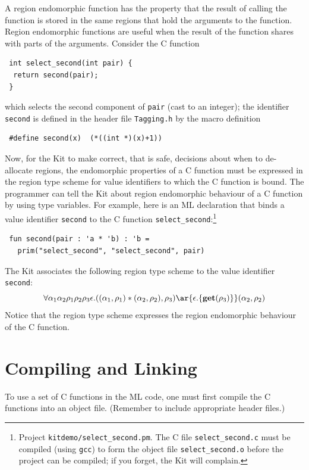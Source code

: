 \documentclass[12pt]{book}
\begin{document}
A region endomorphic function has the property that the result of
calling the function is stored in the same regions that hold the
arguments to the function. Region endomorphic functions are useful
when the result of the function shares with parts of the arguments.
Consider the C function
\begin{verbatim}
 int select_second(int pair) {
  return second(pair);
 }
\end{verbatim}
which selects the second component of {\tt pair} (cast to an
integer); the identifier {\tt second} is defined in the header
file {\tt Tagging.h} by the macro definition
\begin{verbatim}
 #define second(x)  (*((int *)(x)+1))
\end{verbatim}

Now, for the Kit to make correct, that is safe, decisions about when
to de-allocate regions, the endomorphic properties of a C function
must be expressed in the region type scheme for value identifiers
to which the C function is bound. The programmer can tell the Kit
about region endomorphic behaviour of a C function by using type
variables.  For example, here is an ML declaration that binds a value
identifier {\tt second} to the C function
\verb|select_second|:\footnote{Project {\tt kitdemo/select\_second.pm}. The C
  file {\tt select\_second.c} must be compiled (using {\tt gcc}) to
  form the object file {\tt select\_second.o} before the project can
  be compiled; if you forget, the Kit will complain.}
\begin{verbatim}
 fun second(pair : 'a * 'b) : 'b =
   prim("select_second", "select_second", pair)
\end{verbatim}
The Kit associates the following region type scheme to the value
identifier {\tt second}:
$$\forall \alpha_1\alpha_2\rho_1\rho_2\rho_3\epsilon.((\alpha_1,
\rho_1) * (\alpha_2, \rho_2), \rho_3) \ar{\epsilon.\{\Get(\rho_3)\}} (\alpha_2,
\rho_2)$$
Notice that the region type scheme expresses the region endomorphic
behaviour of the C function.

 
\section{Compiling and Linking}
To use a set of C functions in the ML code, one must first compile the
C functions into an object file. (Remember to include appropriate
header files.)
\end{document}
